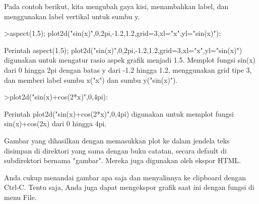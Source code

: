 \documentclass{article}
\begin{document}
\begin{eulernotebook}
\begin{eulercomment}
\begin{eulercomment}
\begin{eulercomment}
\begin{eulercomment}
\begin{eulercomment}
\begin{eulercomment}
\begin{eulercomment}
Pada contoh berikut, kita mengubah gaya kisi, menambahkan label, dan
menggunakan label vertikal untuk sumbu y.
\end{eulercomment}
\begin{eulerprompt}
>aspect(1.5); plot2d("sin(x)",0,2pi,-1.2,1.2,grid=3,xl="x",yl="sin(x)"):
\end{eulerprompt}
\begin{eulercomment}
Perintah aspect(1.5);
plot2d("sin(x)",0,2pi,-1.2,1.2,grid=3,xl="x",yl="sin(x)") digunakan
untuk mengatur rasio aspek grafik menjadi 1.5. Memplot fungsi sin(x)
dari 0 hingga 2pi dengan batas y dari -1.2 hingga 1.2, menggunakan
grid tipe 3, dan memberi label sumbu x("x") dan sumbu y("sin(x)").\\
\end{eulercomment}
\begin{eulerttcomment}
 
\end{eulerttcomment}
\begin{eulerprompt}
>plot2d("sin(x)+cos(2*x)",0,4pi):
\end{eulerprompt}
\begin{eulercomment}
Perintah plot2d("sin(x)+cos(2*x)",0,4pi) digunakan untuk memplot
fungsi sin(x)+cos(2x) dari 0 hingga 4pi.

Gambar yang dihasilkan dengan memasukkan plot ke dalam jendela teks
disimpan di direktori yang sama dengan buku catatan, secara default di
subdirektori bernama "gambar". Mereka juga digunakan oleh ekspor HTML.

Anda cukup menandai gambar apa saja dan menyalinnya ke clipboard
dengan Ctrl-C. Tentu saja, Anda juga dapat mengekspor grafik saat ini
dengan fungsi di menu File.


\end{eulercomment}
\end{eulercomment}
\end{eulercomment}
\end{eulercomment}
\end{eulercomment}
\end{eulercomment}
\end{eulercomment}
\end{eulernotebook}
\end{document}

